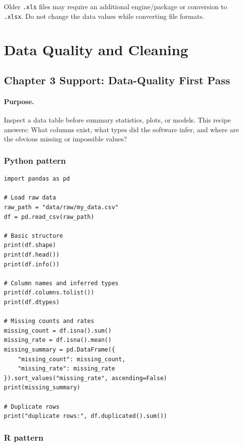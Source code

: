 Older \texttt{.xls} files may require an additional engine/package or conversion to \texttt{.xlsx}.  Do not change the data values while converting file formats.

\section{Data Quality and Cleaning}
\label{app:cookbook-data-quality-cleaning}

\subsection{Chapter 3 Support: Data-Quality First Pass}
\label{app:ch03-software-cookbook-data-quality-first-pass}

\paragraph{Purpose.} Inspect a data table before summary statistics, plots, or models.  This recipe answers: What columns exist, what types did the software infer, and where are the obvious missing or impossible values?

\subsubsection*{Python pattern}

\begin{verbatim}
import pandas as pd

# Load raw data
raw_path = "data/raw/my_data.csv"
df = pd.read_csv(raw_path)

# Basic structure
print(df.shape)
print(df.head())
print(df.info())

# Column names and inferred types
print(df.columns.tolist())
print(df.dtypes)

# Missing counts and rates
missing_count = df.isna().sum()
missing_rate = df.isna().mean()
missing_summary = pd.DataFrame({
    "missing_count": missing_count,
    "missing_rate": missing_rate
}).sort_values("missing_rate", ascending=False)
print(missing_summary)

# Duplicate rows
print("duplicate rows:", df.duplicated().sum())
\end{verbatim}

\subsubsection*{R pattern}

